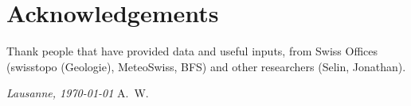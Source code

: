 \chapter*{Acknowledgements}
Thank people that have provided data and useful inputs, from Swiss Offices (swisstopo (Geologie), MeteoSwiss, BFS) and other researchers (Selin, Jonathan).

\bigskip
 
\noindent\textit{Lausanne, \today}
\hfill A.~W.
